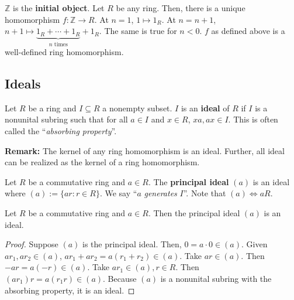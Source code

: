 \documentclass [12pt] {article}
\newcommand{\Z}{\mathbb{Z}}
\newenvironment{definition}[1]{\begin{tcolorbox}[title={Definition: #1},colback=blue!5!white,colframe=black!75!blue]}{\end{tcolorbox}}
\newenvironment{theorem}[1]{\begin{tcolorbox}[title={Theorem #1},colback=green!5!white,colframe=black!75!green]}{\end{tcolorbox}}
\renewcommand{\it}[1]{\textit{{#1}}}
\renewcommand{\bf}[1]{\textbf{{#1}}}
\begin{document}
\begin{definition}{Initial Object}
    $\Z$ is the \bf{initial object}. Let $R$ be any ring. Then, there is a unique homomorphism
    $f : \Z \to R$. At $n = 1$, $1 \mapsto 1_R$. At $n = n + 1$,
    $n + 1 \mapsto \underbrace{1_R + \cdots + 1_R}_{n \text{ times}} + 1_R$. The same is true for
    $n < 0$. $f$ as defined above is a well-defined ring homomorphism.
\end{definition}

\subsection{Ideals}
\begin{definition}{Ideal}
    Let $R$ be a ring and $I \subseteq R$ a nonempty subset. $I$ is an \bf{ideal} of $R$ if $I$ is
    a nonunital subring such that for all $a \in I$ and $x \in R$, $xa, ax \in I$. This is often
    called the ``\it{absorbing property}''.
\end{definition}
\bf{Remark:} The kernel of any ring homomorphism is an ideal. Further, all ideal can be realized as
the kernel of a ring homomorphism.

\begin{definition}{Principal Ideal}
    Let $R$ be a commutative ring and $a \in R$. The \bf{principal ideal} $(a)$ is an ideal where
    $(a) := \{ ar : r \in R \}$. We say ``$a$ \it{generates} $I$''. Note that $(a) \iff aR$.
\end{definition}

\begin{theorem}{}
    Let $R$ be a commutative ring and $a \in R$. Then the principal ideal $(a)$ is an ideal.
\end{theorem}
\begin{proof}
    Suppose $(a)$ is the principal ideal. Then, $0 = a \cdot 0 \in (a)$. Given $ar_1, ar_2 \in (a)$,
    $ar_1 + ar_2 = a(r_1 + r_2) \in (a)$. Take $ar \in (a)$. Then $-ar = a(-r) \in (a)$. Take
    $ar_1 \in (a), r \in R$. Then $(ar_1) r = a(r_1 r) \in (a)$. Because $(a)$ is a nonunital subring
    with the absorbing property, it is an ideal.
\end{proof}
\end{document}
